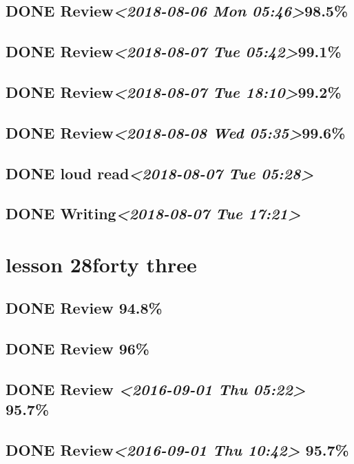 \documentclass[11pt]{ctexart}
\begin{document}
\subsection{{\bfseries\sffamily DONE} Review\textit{<2018-08-06 Mon 05:46>}98.5\%}
\label{sec:org4dcf269}
\subsection{{\bfseries\sffamily DONE} Review\textit{<2018-08-07 Tue 05:42>}99.1\%}
\label{sec:org294a9b6}
\subsection{{\bfseries\sffamily DONE} Review\textit{<2018-08-07 Tue 18:10>}99.2\%}
\label{sec:org641b614}
\subsection{{\bfseries\sffamily DONE} Review\textit{<2018-08-08 Wed 05:35>}99.6\%}
\label{sec:org7565a5f}
\subsection{{\bfseries\sffamily DONE} loud read\textit{<2018-08-07 Tue 05:28>}}
\label{sec:orga5a7469}
\subsection{{\bfseries\sffamily DONE} Writing\textit{<2018-08-07 Tue 17:21>}}
\label{sec:org6f3a2c3}
\section{lesson 28forty three}
\label{sec:org20645eb}
\subsection{{\bfseries\sffamily DONE} Review 94.8\%}
\label{sec:orgfabc72e}
\subsection{{\bfseries\sffamily DONE} Review 96\%}
\label{sec:org354f35e}
\subsection{{\bfseries\sffamily DONE} Review \textit{<2016-09-01 Thu 05:22> } 95.7\%}
\label{sec:orgfe4c60c}
\subsection{{\bfseries\sffamily DONE} Review\textit{<2016-09-01 Thu 10:42> } 95.7\%}
\label{sec:orgc23cc3c}
\end{document}
